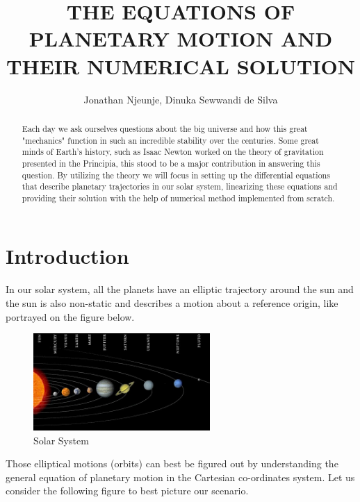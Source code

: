 \documentclass[a4paper]{article}
\title{THE EQUATIONS OF PLANETARY MOTION AND THEIR NUMERICAL SOLUTION}
\author{Jonathan Njeunje, Dinuka Sewwandi de Silva}
\begin{document}
\maketitle

\thispagestyle{empty}

\begin{abstract}
Each day we ask ourselves questions about the big universe and how this great "mechanics" function in such an incredible stability over the centuries. Some great minds of Earth's history, such as Isaac Newton worked on the theory of gravitation presented in the Principia, this stood to be a major contribution in answering this question. By utilizing the theory we will focus in setting up the differential equations that describe planetary trajectories in our solar system, linearizing these equations and providing their solution with the help of numerical method implemented from scratch.
\end{abstract}

\section{Introduction}

In our solar system, all the planets have an elliptic trajectory around the sun and the sun is also non-static and describes a motion about a reference origin, like portrayed on the figure below.
\\
\begin{figure}[H]
\centering
\includegraphics[width=0.6\textwidth]{Solar.jpg}
\caption{Solar System}
\label{fig:SolarSystem}
\end{figure}


Those elliptical motions (orbits) can best be figured out by understanding the general equation of planetary motion in the Cartesian co-ordinates system. Let us consider the following figure to best picture our scenario.
\end{document}
